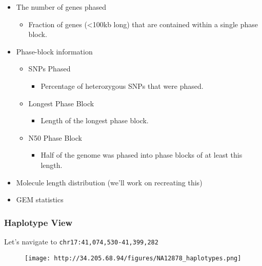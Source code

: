 \documentclass[]{article}
\providecommand{\tightlist}{%
  \setlength{\itemsep}{0pt}\setlength{\parskip}{0pt}}
\begin{document}
\begin{itemize}
\tightlist
\item
  The number of genes phased

  \begin{itemize}
  \tightlist
  \item
    Fraction of genes (\textless{}100kb long) that are contained within
    a single phase block.
  \end{itemize}
\item
  Phase-block information

  \begin{itemize}
  \tightlist
  \item
    SNPs Phased

    \begin{itemize}
    \tightlist
    \item
      Percentage of heterozygous SNPs that were phased.
    \end{itemize}
  \item
    Longest Phase Block

    \begin{itemize}
    \tightlist
    \item
      Length of the longest phase block.
    \end{itemize}
  \item
    N50 Phase Block

    \begin{itemize}
    \tightlist
    \item
      Half of the genome was phased into phase blocks of at least this
      length.
    \end{itemize}
  \end{itemize}
\item
  Molecule length distribution (we'll work on recreating this)
\item
  GEM statistics
\end{itemize}

\subsubsection{Haplotype View}\label{haplotype-view}

Let's navigate to \texttt{chr17:41,074,530-41,399,282}

\begin{figure}[htbp]
\centering
\texttt{[image: http://34.205.68.94/figures/NA12878\_haplotypes.png]}
\caption{}
\end{figure}
\end{document}
